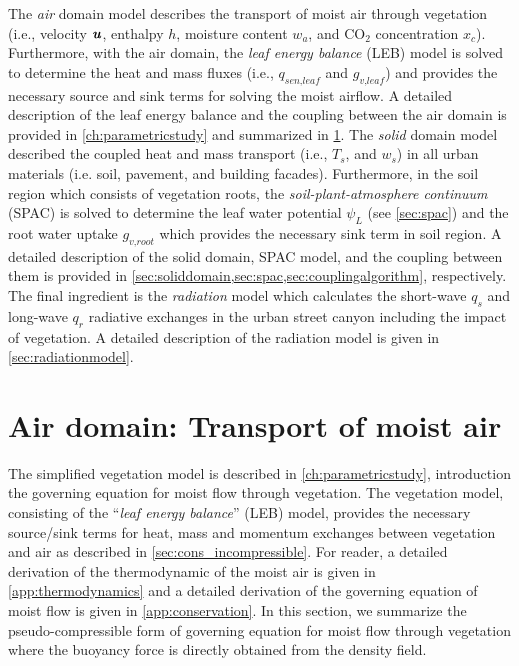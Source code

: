 The \textit{air} domain model describes the transport of moist air through vegetation (i.e., velocity $\textbf{\textit{u}}$, enthalpy $h$, moisture content $w_a$, and CO$_2$ concentration $x_c$). Furthermore, with the air domain, the \textit{leaf energy balance} (LEB) model is solved to determine the heat and mass fluxes (i.e., $q_{\textit{sen,leaf}}$ and $g_{\textit{v,leaf}}$) and provides the necessary source and sink terms for solving the moist airflow. A detailed description of the leaf energy balance and the coupling between the air domain is provided in \cref{ch:parametricstudy} and summarized in \cref{sec:airdomain}. The \textit{solid} domain model described the coupled heat and mass transport (i.e., $T_s$, and $w_s$) in all urban materials (i.e. soil, pavement, and building facades). Furthermore, in the soil region which consists of vegetation roots, the \textit{soil-plant-atmosphere continuum} (SPAC) is solved to determine the leaf water potential $\psi_L$ (see \cref{sec:spac}) and the root water uptake $g_{\textit{v,root}}$ which provides the necessary sink term in soil region. A detailed description of the solid domain, SPAC model, and the coupling between them is provided in \cref{sec:soliddomain,sec:spac,sec:couplingalgorithm}, respectively. The final ingredient is the \textit{radiation} model which calculates the short-wave $q_s$ and long-wave $q_r$ radiative exchanges in the urban street canyon including the impact of vegetation. A detailed description of the radiation model is given in \cref{sec:radiationmodel}.

\section{Air domain: Transport of moist air}
\label{sec:airdomain}
The simplified vegetation model is described in \cref{ch:parametricstudy}, introduction the governing equation for moist flow through vegetation. The vegetation model, consisting of the ``\textit{leaf energy balance}'' (LEB) model, provides the necessary source/sink terms for heat, mass and momentum exchanges between vegetation and air as described in \cref{sec:cons_incompressible}. For reader, a detailed derivation of the thermodynamic of the moist air is given in \cref{app:thermodynamics} and a detailed derivation of the governing equation of moist flow is given in \cref{app:conservation}. In this section, we summarize the pseudo-compressible form of governing equation for moist flow through vegetation where the buoyancy force is directly obtained from the density field.  


